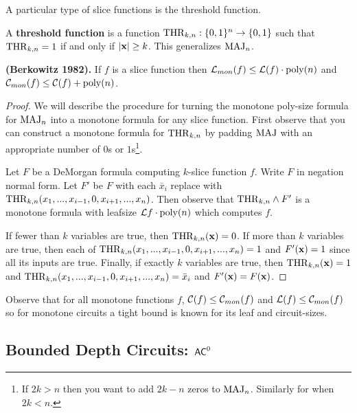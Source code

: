 \documentclass[11pt]{article}
\begin{document}
		A particular type of slice functions is the threshold function.
		\begin{definition}
			\label{def:FUN-threshold}
			A \textbf{threshold function} is a function $\mathrm{THR}_{k,n}: \{0,1\}^n \rightarrow \{0,1\}$ such that $\mathrm{THR}_{k,n} = 1$ if and only if $|\mathbf{x}| \geq k$. This generalizes $\mathrm{MAJ}_n$.
		\end{definition}
	
		\begin{theorem}
			\textbf{(Berkowitz 1982).} If $f$ is a slice function then $\mathcal{L}_{mon}(f) \leq \mathcal{L}(f) \cdot \operatorname*{poly}(n)$ and $\mathcal{C}_{mon}(f) \leq \mathcal{C}(f) + \operatorname*{poly}(n)$.
		\end{theorem}
		\begin{proof}
			We will describe the procedure for turning the monotone poly-size formula for $\mathrm{MAJ}_n$ into a monotone formula for any slice function. First observe that you can construct a monotone formula for $\mathrm{THR}_{k,n}$ by padding $\mathrm{MAJ}$ with an appropriate number of $0$s or $1$s\footnote{If $2k > n$ then you want to add $2k-n$ zeros to $\mathrm{MAJ}_n$. Similarly for when $2k < n$.}.
			
			Let $F$ be a DeMorgan formula computing $k$-slice function $f$. Write $F$ in negation normal form. Let $F'$ be $F$ with each $\bar{x}_i$ replace with $\mathrm{THR}_{k,n}(x_1, ..., x_{i-1}, 0, x_{i+1}, ..., x_n)$. Then observe that $\mathrm{THR}_{k,n} \land F'$ is a monotone formula with leafsize $\mathcal{L}{f}\cdot \operatorname*{poly}(n)$ which computes $f$. 
			
			If fewer than $k$ variables are true, then $\mathrm{THR}_{k,n}(\mathbf{x}) = 0$. If more than $k$ variables are true, then each of $\mathrm{THR}_{k,n}(x_1, ..., x_{i-1}, 0, x_{i+1}, ..., x_n) = 1$ and $F'(\mathbf{x}) = 1$ since all its inputs are true. Finally, if exactly $k$ variables are true, then $\mathrm{THR}_{k,n}(\mathbf{x}) = 1$ and $\mathrm{THR}_{k,n}(x_1, ..., x_{i-1}, 0, x_{i+1}, ..., x_n) = \bar{x}_i$ and $F'(\mathbf{x}) = F(\mathbf{x})$.
		\end{proof}
		Observe that for all monotone functions $f$, $\mathcal{C}(f) \leq \mathcal{C}_{mon}(f)$ and $\mathcal{L}(f) \leq \mathcal{C}_{mon}(f)$ so for monotone circuits a tight bound is known for its leaf and circuit-sizes.
	
	\subsection{Bounded Depth Circuits: \texorpdfstring{$\mathsf{AC}^0$}{AC0}}
	
\end{document}
